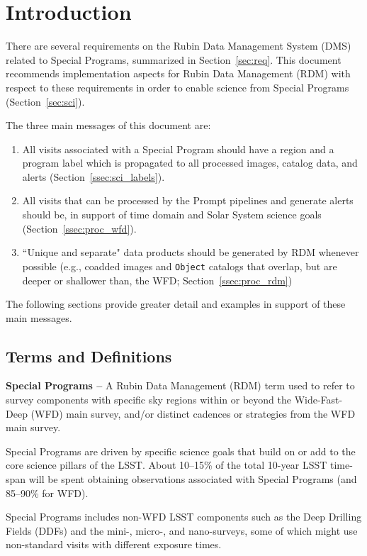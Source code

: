 \section{Introduction} \label{sec:intro}

There are several requirements on the Rubin Data Management System (DMS) 
related to Special Programs, summarized in Section~\ref{sec:req}.
This document recommends implementation aspects for Rubin Data Management (RDM)
with respect to these requirements in order to 
enable science from Special Programs (Section~\ref{sec:sci}).

The three main messages of this document are:
\begin{enumerate}
\item All visits associated with a Special Program should have a region and a program label 
which is propagated to all processed images, catalog data, and alerts (Section~\ref{ssec:sci_labels}).
\item All visits that can be processed by the Prompt pipelines and generate 
alerts should be, in support of time domain and Solar System science goals (Section~\ref{ssec:proc_wfd}).
\item ``Unique and separate" data products should be generated by RDM whenever possible 
(e.g., coadded images and {\tt Object} catalogs that overlap, but are deeper or shallower than, the WFD; Section~\ref{ssec:proc_rdm}) 
\end{enumerate}

The following sections provide greater detail and examples in support of these main messages.


\subsection{Terms and Definitions}\label{ssec:intro_terms}

\textbf{Special Programs -- } 
A Rubin Data Management (RDM) term used to refer to survey 
components with specific sky regions within or beyond the 
Wide-Fast-Deep (WFD) main survey, and/or distinct cadences or 
strategies from the WFD main survey.

Special Programs are driven by specific science goals that build on or 
add to the core science pillars of the LSST.
About 10--15\% of the total 10-year LSST time-span will be spent obtaining 
observations associated with Special Programs (and 85--90\% for WFD).

Special Programs includes non-WFD LSST components such as the Deep Drilling 
Fields (DDFs) and the mini-, micro-, and nano-surveys, some of which 
might use non-standard visits with different exposure times.

